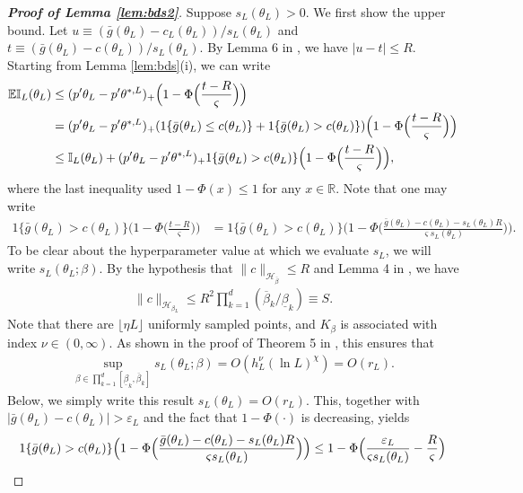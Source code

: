 \documentclass[letterpaper,11pt]{article}
\theoremstyle{myplain}
\theoremstyle{mydefinition}
\theoremstyle{myremark}
\renewcommand{\cite}{\citet}
\newcommand{\EI}{\mathbb{EI}}
\numberwithin{equation}{section}
\numberwithin{figure}{section}
\begin{document}
\begin{appendix}
\begin{proof}[\rm \textbf{Proof of Lemma \ref{lem:bds2}}]
Suppose $s_L(\theta_L)>0$. We first show the upper bound. Let $u\equiv (\bar g(\theta_L)-c_L(\theta_L))/s_L(\theta_L)$ and $t\equiv (\bar g(\theta_L)-c(\theta_L))/s_L(\theta_L)$.
By Lemma 6 in \cite{Bull_Convergence_2011}, we have $|u-t|\le R.$ Starting from Lemma \ref{lem:bds}(i), we can write
\begin{align}
	\EI_L(\theta_L)&\le (p'\theta_L-p'\theta^{*,L})_+\Big(1-\Phi\Big(\frac{t-R}{\varsigma}\Big)\Big)\notag\\
	&= (p'\theta_L-p'\theta^{*,L})_+(1\{\bar g(\theta_L)\le c(\theta_L)\}+1\{\bar g(\theta_L)> c(\theta_L)\})\Big(1-\Phi\Big(\frac{t-R}{\varsigma}\Big)\Big)\notag\\
	&\le \mathbb{I}_L(\theta_L)+(p'\theta_L-p'\theta^{*,L})_+1\{\bar g(\theta_L)> c(\theta_L)\}\Big(1-\Phi\Big(\frac{t-R}{\varsigma}\Big)\Big),\label{eq:bds1}
\end{align}
where the last inequality used $1-\Phi(x)\le 1$ for any $x\in\mathbb R$.
Note that one may write
\begin{align}
	1\{\bar g(\theta_L)> c(\theta_L)\}\Big(1-\Phi\Big(\frac{t-R}{\varsigma}\Big)\Big)&=1\{\bar g(\theta_L)> c(\theta_L)\}\Big(1-\Phi\Big(\frac{\bar g(\theta_L)- c(\theta_L)-s_L(\theta_L)R}{\varsigma s_L(\theta_L)}\Big)\Big).\label{eq:bds2}
\end{align}
To be clear about the hyperparameter value at which  we evaluate $s_L$, we will write $s_L(\theta_L;\beta)$.
By the hypothesis that $\|c\|_{\mathcal H_{\bar\beta}}\le R$ and Lemma 4 in \cite{Bull_Convergence_2011}, we have
\begin{align}
\|c\|_{\mathcal H_{\beta_L}}\le R^2\prod_{k=1}^d(\overline{\beta}_k/\underline{\beta}_k) \equiv S.	\label{eq:eiconv3}
\end{align}
Note that there are $\lfloor\eta L\rfloor$ uniformly sampled points, and $K_\beta$ is associated with index $\nu\in (0,\infty)$.
As shown in the proof of Theorem 5 in \cite{Bull_Convergence_2011}, this ensures that
\begin{align}
	\sup_{\beta\in \prod_{k=1}^d[\underline\beta_k,\overline\beta_k]}s_L(\theta_L;\beta)=O(h_L^\nu(\ln L)^\chi)=O(r_L).\label{eq:eiconv3a}
\end{align}
Below, we simply write this result $s_L(\theta_L)=O(r_L).$
 This, together with $|\bar g(\theta_L)- c(\theta_L)|>\varepsilon_L$ and the fact that $1-\Phi(\cdot)$ is decreasing, yields
\begin{align}
1\{\bar g(\theta_L)> c(\theta_L)\}\Big(1-\Phi\Big(\frac{\bar g(\theta_L)- c(\theta_L)-s_L(\theta_L)R}{\varsigma s_L(\theta_L)}\Big)\Big)&\le 1-\Phi\Big(\frac{\varepsilon_L}{ \varsigma s_L(\theta_L)}-\frac{R}{\varsigma}\Big)\notag\\

\end{align}
\end{proof}
\end{appendix}
\end{document}
